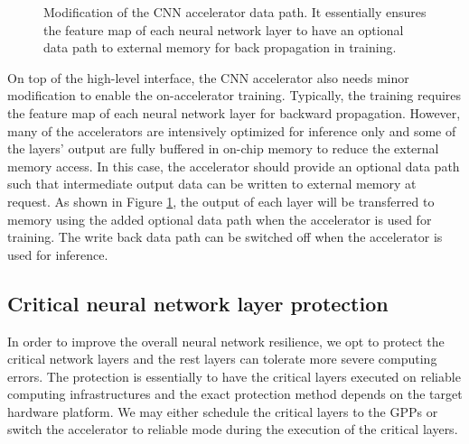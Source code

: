 
\begin{figure}
        \caption{Modification of the CNN accelerator data path. It essentially
ensures the feature map of each neural network layer to have an optional data path
to external memory for back propagation in training.}
        \label{fig:change_of_accelerator}
        \vspace{-1em}
\end{figure}

On top of the high-level interface, the CNN accelerator also needs 
minor modification to enable the on-accelerator training. 
Typically, the training requires the feature map of each neural 
network layer for backward propagation. However, many of the accelerators 
are intensively optimized for inference only and some of the layers' output 
are fully buffered in on-chip memory to reduce the external memory access. 
In this case, the accelerator should provide an optional data path such that 
intermediate output data can be written to external memory at request.
As shown in Figure \ref{fig:change_of_accelerator}, the output of each layer 
will be transferred to memory using the added optional data path 
when the accelerator is used for training. The write back data path 
can be switched off when the accelerator is used for inference. 

\subsection{Critical neural network layer protection}
In order to improve the overall neural network resilience, we opt to 
protect the critical network layers and the rest layers can tolerate 
more severe computing errors. The protection is essentially 
to have the critical layers executed on reliable computing infrastructures 
and the exact protection method depends on the target hardware platform.
We may either schedule the critical layers to the GPPs or switch the accelerator 
to reliable mode during the execution of the critical layers.

